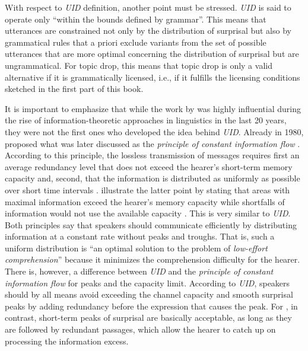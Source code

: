 With respect to  \textit{UID} definition, another point must be stressed.
\textit{UID} is said to operate only ``within the bounds defined by grammar''.
This means that utterances are constrained not only by the distribution of surprisal but also by grammatical rules that a priori exclude variants from the set of possible utterances that are more optimal concerning the distribution of surprisal but are ungrammatical.
For topic drop, this means that topic drop is only a valid alternative if it is grammatically licensed, i.e., if it fulfills the licensing conditions sketched in the first part of this book.

It is important to emphasize that while the work by \citet{levy.jaeger2007} was highly influential during the rise of information-theoretic approaches in linguistics in the last 20 years, they were not the first ones who developed the idea behind \textit{UID}.
Already in 1980, \citet{fenk.fenk1980} proposed what was later discussed as the \textit{principle of constant information flow} \citep[536]{fenk-oczlon1989}.
According to this principle, the lossless transmission of messages requires first an average redundancy level that does not exceed the hearer's short-term memory capacity and, second, that the information  is distributed as uniformly as possible over short time intervals \citep[402]{fenk.fenk1980}.
\citet[402]{fenk.fenk1980} illustrate the latter point by stating that areas with maximal information exceed the hearer's memory capacity while shortfalls of information  would not use the available capacity \citep[see also][38]{fenk-oczlon1990}.
This is very similar to \textit{UID}.
Both principles say that speakers should communicate efficiently by distributing information at a constant rate without peaks and troughs.
That is, such a uniform distribution is ``an optimal solution to the problem of \textit{low-effort comprehension}'' \citep[851, original emphasis]{levy.jaeger2007} because it minimizes the comprehension difficulty for the hearer.
There is, however, a difference between \textit{UID} and the \textit{principle of constant information flow} for peaks and the capacity limit.
According to \textit{UID}, speakers should by all means avoid exceeding the channel capacity  and smooth surprisal peaks by adding redundancy before the expression that causes the peak.
For \citet[403]{fenk.fenk1980}, in contrast, short-term peaks of surprisal are basically acceptable, as long as they are followed by redundant passages, which allow the hearer to catch up on processing the information excess.
